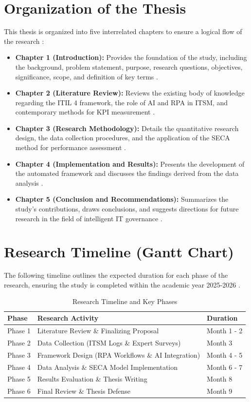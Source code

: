 \documentclass[12pt,a4paper,oneside]{report}
\begin{document}
\section{Organization of the Thesis}
This thesis is organized into five interrelated chapters to ensure a logical flow of the research \cite{almontaser2025}:
\begin{itemize}
    \item \textbf{Chapter 1 (Introduction):} Provides the foundation of the study, including the background, problem statement, purpose, research questions, objectives, significance, scope, and definition of key terms \cite{almontaser2025}.
    \item \textbf{Chapter 2 (Literature Review):} Reviews the existing body of knowledge regarding the ITIL 4 framework, the role of AI and RPA in ITSM, and contemporary methods for KPI measurement \cite{almontaser2025}.
    \item \textbf{Chapter 3 (Research Methodology):} Details the quantitative research design, the data collection procedures, and the application of the SECA method for performance assessment \cite{almontaser2025}.
    \item \textbf{Chapter 4 (Implementation and Results):} Presents the development of the automated framework and discusses the findings derived from the data analysis \cite{almontaser2025}.
    \item \textbf{Chapter 5 (Conclusion and Recommendations):} Summarizes the study’s contributions, draws conclusions, and suggests directions for future research in the field of intelligent IT governance \cite{almontaser2025}.
\end{itemize}

\section{Research Timeline (Gantt Chart)}
The following timeline outlines the expected duration for each phase of the research, ensuring the study is completed within the academic year 2025-2026 \cite{almontaser2025}.

\begin{table}[h!]
\centering
\caption{Research Timeline and Key Phases}
\begin{tabular}{lll}
\toprule
\textbf{Phase} & \textbf{Research Activity} & \textbf{Duration} \\
\midrule
Phase 1 & Literature Review \& Finalizing Proposal & Month 1 - 2 \\
Phase 2 & Data Collection (ITSM Logs \& Expert Surveys) & Month 3 \\
Phase 3 & Framework Design (RPA Workflows \& AI Integration) & Month 4 - 5 \\
Phase 4 & Data Analysis \& SECA Model Implementation & Month 6 - 7 \\
Phase 5 & Results Evaluation \& Thesis Writing & Month 8 \\
Phase 6 & Final Review \& Thesis Defense & Month 9 \\
\bottomrule
\end{tabular}
\end{table}
\end{document}
